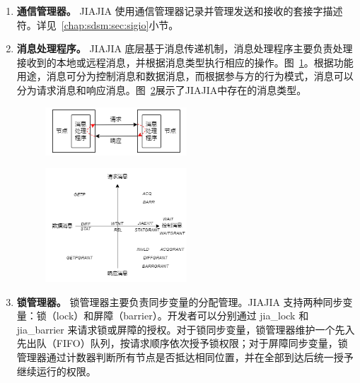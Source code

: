 {\begin{enumerate}[label=\arabic*.]
    \item \textbf{通信管理器。} JIAJIA 使用通信管理器记录并管理发送和接收的套接字描述符。详见~\ref{chap:sdsm:sec:sigio}小节。
    
    \item \textbf{消息处理程序。} JIAJIA 底层基于消息传递机制，消息处理程序主要负责处理接收到的本地或远程消息，并根据消息类型执行相应的操作。图~\ref{fig:JIAJIA-message-handle}。根据功能用途，消息可分为控制消息和数据消息，而根据参与方的行为模式，消息可以分为请求消息和响应消息。图~\ref{fig:JIAJIA-message-types}展示了JIAJIA中存在的消息类型。
    \begin{figure}[!htbp]
        \centering
        \includegraphics[width=0.50\textwidth]{Img/message-handler.png}
        \label{fig:JIAJIA-message-handle}
    \end{figure}

    \begin{figure}[!htbp]
        \centering
        \includegraphics[width=0.50\textwidth]{Img/message-types.png}
        \label{fig:JIAJIA-message-types}
    \end{figure}

    \item \textbf{锁管理器。} 锁管理器主要负责同步变量的分配管理。JIAJIA 支持两种同步变量：锁（lock）和屏障（barrier）。开发者可以分别通过 jia\_lock 和 jia\_barrier 来请求锁或屏障的授权。对于锁同步变量，锁管理器维护一个先入先出队（FIFO）队列，按请求顺序依次授予锁权限；对于屏障同步变量，锁管理器通过计数器判断所有节点是否抵达相同位置，并在全部到达后统一授予继续运行的权限。
\end{enumerate}

}
